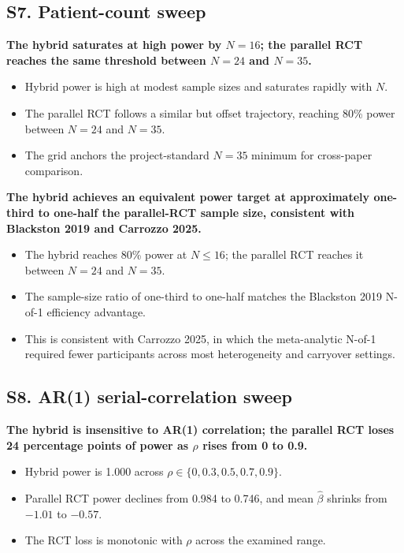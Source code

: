 \documentclass[
  11pt,
]{article}
\begin{document}
\subsection{S7. Patient-count sweep}\label{s7.-patient-count-sweep}

\textbf{The hybrid saturates at high power by $N = 16$; the parallel RCT reaches the same threshold between $N = 24$ and $N = 35$.}

\begin{itemize}\setlength{\itemsep}{2pt}\setlength{\parskip}{0pt}
\item Hybrid power is high at modest sample sizes and saturates rapidly with $N$.
\item The parallel RCT follows a similar but offset trajectory, reaching 80\% power between $N = 24$ and $N = 35$.
\item The grid anchors the project-standard $N = 35$ minimum for cross-paper comparison.
\end{itemize}

\textbf{The hybrid achieves an equivalent power target at approximately one-third to one-half the parallel-RCT sample size, consistent with Blackston 2019 and Carrozzo 2025.}

\begin{itemize}\setlength{\itemsep}{2pt}\setlength{\parskip}{0pt}
\item The hybrid reaches 80\% power at $N \leq 16$; the parallel RCT reaches it between $N = 24$ and $N = 35$.
\item The sample-size ratio of one-third to one-half matches the Blackston 2019 N-of-1 efficiency advantage.
\item This is consistent with Carrozzo 2025, in which the meta-analytic N-of-1 required fewer participants across most heterogeneity and carryover settings.
\end{itemize}

\subsection{S8. AR(1) serial-correlation sweep}\label{s8.-ar1-serial-correlation-sweep}

\textbf{The hybrid is insensitive to AR(1) correlation; the parallel RCT loses 24 percentage points of power as $\rho$ rises from 0 to 0.9.}

\begin{itemize}\setlength{\itemsep}{2pt}\setlength{\parskip}{0pt}
\item Hybrid power is 1.000 across $\rho \in \{0, 0.3, 0.5, 0.7, 0.9\}$.
\item Parallel RCT power declines from 0.984 to 0.746, and mean $\hat\beta$ shrinks from $-1.01$ to $-0.57$.
\item The RCT loss is monotonic with $\rho$ across the examined range.
\end{itemize}
\end{document}
